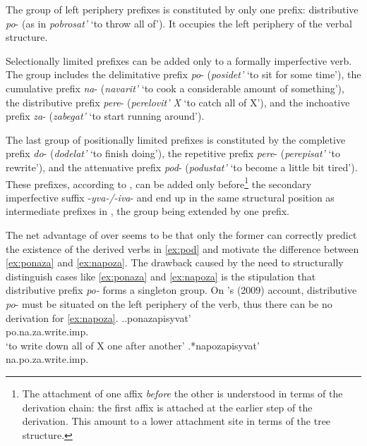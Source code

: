 The group of left periphery prefixes is constituted by only one prefix: distributive \textit{po}- (as in \textit{pobrosat'} `to throw all of'). It occupies the left periphery of the verbal structure.

Selectionally limited prefixes can be added only to a formally imperfective verb. The group includes the delimitative prefix \textit{po}- (\textit{posidet'} `to sit for some time'), the cumulative prefix \textit{na}- (\textit{navarit'} `to cook a considerable amount of something'), the distributive prefix \textit{pere}- (\textit{perelovit' X} `to catch all of X'), and the inchoative prefix \textit{za}- (\textit{zabegat'} `to start running around').

The last group of positionally limited prefixes is constituted by the completive prefix \textit{do}- (\textit{dodelat'} `to finish doing'), the repetitive prefix \textit{pere}- (\textit{perepisat'} `to rewrite'), and the attenuative prefix \textit{pod}- (\textit{podustat'} `to become a little bit tired'). These prefixes, according to \citet{Tatevosov:09}, can be added only before\footnote{The attachment of one affix \textit{before} the other is understood in terms of the derivation chain: the first affix is attached at the earlier step of the derivation. This amount to a lower attachment site in terms of the tree structure.} the secondary imperfective suffix -\textit{yva-/-iva}- and end up in the same structural position as intermediate prefixes in \citet{Tatevosov:07}, the group being extended by one prefix.
	
The net advantage of \citet{Tatevosov:09} over \citet{Tatevosov:07} seems to be that only the former can correctly predict the existence of the derived verbs in \ref{ex:pod} and motivate the difference between \ref{ex:ponaza} and \ref{ex:napoza}. The drawback caused by the need to structurally distinguish cases like \ref{ex:ponaza} and \ref{ex:napoza} is the stipulation that distributive prefix \textit{po-} forms a singleton group. On \citeauthor{Tatevosov:09}'s (2009) account, distributive \textit{po}- must be situated on the left periphery of the verb, thus there can be no derivation for \ref{ex:napoza}.
\ex.\ag.\label{ex:ponaza}ponazapisyvat'\\
po.na.za.write.imp.\\
\trans `to write down all of X one after another'
\bg.\label{ex:napoza}*napozapisyvat'\\
na.po.za.write.imp.\\

